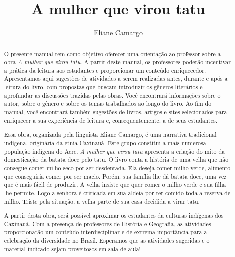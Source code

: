 \documentclass[11pt]{extarticle}
\newcommand{\AutorLivro}{Eliane Camargo}
\newcommand{\TituloLivro}{A mulher que virou tatu}
\newcommand{\colaborador}{Ana Lancman}
\begin{document}
\title{\TituloLivro}
\author{\AutorLivro}
\def\authornotes{\colaborador}

\date{}
\maketitle


\tableofcontents

\pagebreak

\begin{abstract}

O presente manual tem como objetivo oferecer uma orientação ao professor sobre a obra \textit{A mulher que virou tatu}. A partir deste manual, os professores poderão incentivar a prática da leitura aos estudantes e proporcionar um conteúdo enriquecedor. Apresentamos aqui sugestões de atividades a serem realizadas antes, durante e após a leitura do livro, com propostas que buscam introduzir os gêneros literários e aprofundar as discussões trazidas pelas obras. Você encontrará informações sobre o autor, sobre o gênero e sobre os temas trabalhados ao longo do livro. Ao fim do manual, você encontrará também sugestões de livros, artigos e sites selecionados para enriquecer a sua experiência de leitura e, consequentemente, a de seus estudantes.

Essa obra, organizada pela linguista Eliane Camargo, é uma narrativa tradicional indígena, originária da etnia Caxinauá. Este grupo constitui a mais numerosa população indígena do Acre. \textit{A mulher que virou tatu} apresenta a criação do mito da domesticação da batata doce pelo tatu. O livro conta a história de uma velha que não consegue comer milho seco por ser desdentada. Ela deseja comer milho verde, alimento que conseguiria comer por ser macio. Porém, sua família lhe dá batata doce, uma vez que é mais fácil de produzir. A velha insiste que quer comer o milho verde e sua filha lhe permite. Logo a senhora é criticada em sua aldeia por ter comido toda a reserva de milho. Triste pela situação, a velha parte de sua casa decidida a virar tatu. 

A partir desta obra, será possível aproximar os estudantes da culturas indígenas dos Caxinauá. Com a presença de professores de História e Geografia, as atividades proporcionarão um conteúdo interdisciplinar e de extrema importância para a celebração da diversidade no Brasil. Esperamos que as atividades sugeridas e o material indicado sejam proveitosos em sala de aula! 

\end{abstract}
\end{document}
